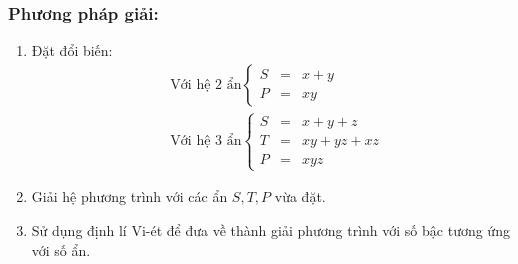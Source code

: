 \documentclass[12pt,a4paper,oneside]{book}
\theoremstyle{theorem}
\theoremstyle{definition}
\begin{document}
\subsubsection{Phương pháp giải:}
\begin{enumerate}
    \item Đặt đổi biến:\begin{align*}
    &\text{Với hệ 2 ẩn}\left\{\begin{array}{lcl}
       S&=&x+y    \\
       P&=&xy  
    \end{array}\right.\\
      &\text{Với hệ 3 ẩn}\left\{\begin{array}{lcl}
       S&=&x+y+z  \\
       T&=&xy+yz+xz \\
       P&=&xyz  
    \end{array}\right.  \end{align*}
    \item Giải hệ phương trình với các ẩn $S,T,P$ vừa đặt.
    \item Sử dụng định lí Vi-ét để đưa về thành giải phương trình với số bậc tương ứng với số ẩn.
\end{enumerate}
\end{document}
